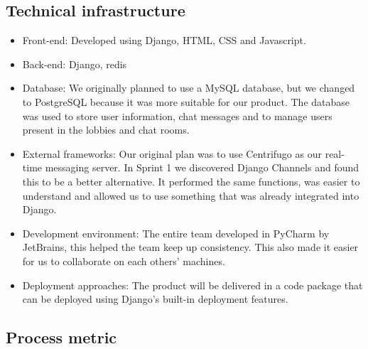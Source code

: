 \subsection{Technical infrastructure}
\begin{itemize}
    \item Front-end: Developed using Django, HTML, CSS and Javascript.
    \item Back-end: Django, redis
    \item Database: We originally planned to use a MySQL database, but we changed to PostgreSQL because it was more suitable for our product. The database was used to store user information, chat messages and to manage users present in the lobbies and chat rooms. 
    \item External frameworks: Our original plan was to use Centrifugo as our real-time messaging server. In Sprint 1 we discovered Django Channels and found this to be a better alternative. It performed the same functions, was easier to understand and allowed us to use something that was already integrated into Django.
    \item Development environment: The entire team developed in PyCharm by JetBrains, this helped the team keep up consistency. This also made it easier for us to collaborate on each others' machines.
    \item  Deployment approaches: The product will be delivered in a code package that can be deployed using Django's built-in deployment features.
\end{itemize}

\newpage
\subsection{Process metric}
